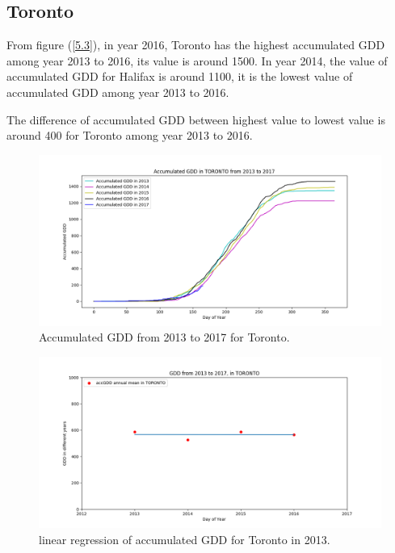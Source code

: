 \documentclass[12pt]{article}
\begin{document}
\subsection{Toronto}

From figure (\ref{5.3}), in year 2016, Toronto has the highest accumulated GDD among year 2013 to 2016, its value is around 1500. In year 2014, the value of accumulated GDD for Halifax is around 1100, it is the lowest value of accumulated GDD among year 2013 to 2016. 

The difference of accumulated GDD between highest value to lowest value is around 400 for Toronto among year 2013 to 2016.

\begin{center}
\begin{figure}[H]
\includegraphics[width=5.25in]{../Plot/TORONTO/accGDD_2013_2017.png}
\caption{Accumulated GDD from 2013 to 2017 for Toronto.}
\label{13}
\end{figure}
\end{center}

\begin{center}
\begin{figure}[H]
\includegraphics[width=5.25in]{../Plot/TORONTO/GDD_LinearRegression_TORONTO.png}
\caption{linear regression of accumulated GDD for Toronto in 2013.}
\label{14}
\end{figure}
\end{center}
\end{document}
